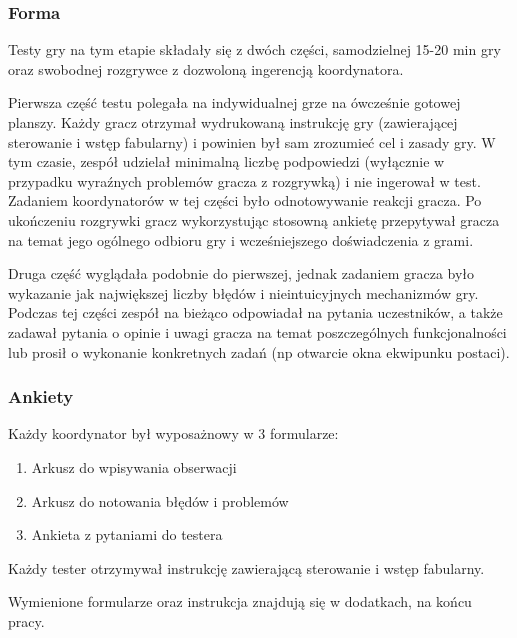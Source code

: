 \documentclass[licencjacka]{pracamgr}
\begin{document}
      \subsubsection{Forma}
      Testy gry na tym etapie składały się z dwóch części, samodzielnej 15-20 min gry
      oraz swobodnej rozgrywce z dozwoloną ingerencją koordynatora.
      
      Pierwsza część testu polegała na indywidualnej grze na ówcześnie gotowej planszy.
      Każdy gracz otrzymał wydrukowaną instrukcję gry (zawierającej sterowanie i wstęp fabularny)
      i powinien był sam zrozumieć cel i zasady gry. W tym czasie, zespół udzielał minimalną liczbę
      podpowiedzi (wyłącznie w przypadku wyraźnych problemów gracza z rozgrywką) i nie ingerował w test.
      Zadaniem koordynatorów w tej części było odnotowywanie reakcji gracza. 
      Po ukończeniu rozgrywki gracz wykorzystując stosowną ankietę przepytywał gracza na temat 
      jego ogólnego odbioru gry i wcześniejszego doświadczenia z grami. 
      
      Druga część wyglądała podobnie do pierwszej, jednak zadaniem gracza było wykazanie 
      jak największej liczby błędów i nieintuicyjnych mechanizmów gry. 
      Podczas tej części zespół na bieżąco odpowiadał na pytania uczestników,
      a także zadawał pytania o opinie i uwagi gracza na temat poszczególnych funkcjonalności
      lub prosił o wykonanie konkretnych zadań (np otwarcie okna ekwipunku postaci).

      \subsubsection{Ankiety}
      Każdy koordynator był wyposażnowy w 3 formularze:
      \begin{enumerate}
	\item Arkusz do wpisywania obserwacji
	\item Arkusz do notowania błędów i problemów
	\item Ankieta z pytaniami do testera
      \end{enumerate}
      
      Każdy tester otrzymywał instrukcję zawierającą sterowanie i wstęp fabularny.
      
      Wymienione formularze oraz instrukcja znajdują się w dodatkach, na końcu pracy.
  
\end{document}
